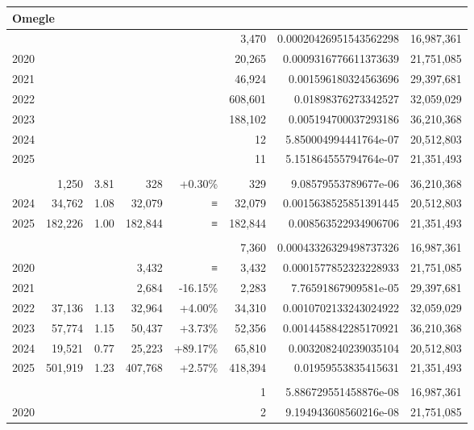 \begin{table}[!t]
\begin{tabular*}{\linewidth}{@{\extracolsep{\fill}}l|rrrrrrr}
\multicolumn{8}{l}{Omegle} \\[2.5pt] 
\midrule\addlinespace[2.5pt]
2019 &  &  &  &  & 3,470 & 0.00020426951543562298 & 16,987,361 \\
2020 &  &  &  &  & 20,265 & 0.0009316776611373639 & 21,751,085 \\
2021 &  &  &  &  & 46,924 & 0.001596180324563696 & 29,397,681 \\
2022 &  &  &  &  & 608,601 & 0.01898376273342527 & 32,059,029 \\
2023 &  &  &  &  & 188,102 & 0.005194700037293186 & 36,210,368 \\
2024 &  &  &  &  & 12 & 5.850004994441764e-07 & 20,512,803 \\
2025 &  &  &  &  & 11 & 5.151864555794764e-07 & 21,351,493 \\
\midrule\addlinespace[2.5pt]
\multicolumn{8}{l}{OpenAI} \\[2.5pt] 
\midrule\addlinespace[2.5pt]
2023 & 1,250 & 3.81 & 328 & +0.30\% & 329 & 9.08579553789677e-06 & 36,210,368 \\
2024 & 34,762 & 1.08 & 32,079 & ≡ & 32,079 & 0.0015638525851391445 & 20,512,803 \\
2025 & 182,226 & 1.00 & 182,844 & ≡ & 182,844 & 0.008563522934906706 & 21,351,493 \\
\midrule\addlinespace[2.5pt]
\multicolumn{8}{l}{Pinterest} \\[2.5pt] 
\midrule\addlinespace[2.5pt]
2019 &  &  &  &  & 7,360 & 0.00043326329498737326 & 16,987,361 \\
2020 &  &  & 3,432 & ≡ & 3,432 & 0.0001577852323228933 & 21,751,085 \\
2021 &  &  & 2,684 & -16.15\% & 2,283 & 7.76591867909581e-05 & 29,397,681 \\
2022 & 37,136 & 1.13 & 32,964 & +4.00\% & 34,310 & 0.0010702133243024922 & 32,059,029 \\
2023 & 57,774 & 1.15 & 50,437 & +3.73\% & 52,356 & 0.0014458842285170921 & 36,210,368 \\
2024 & 19,521 & 0.77 & 25,223 & +89.17\% & 65,810 & 0.003208240239035104 & 20,512,803 \\
2025 & 501,919 & 1.23 & 407,768 & +2.57\% & 418,394 & 0.01959553835415631 & 21,351,493 \\
\midrule\addlinespace[2.5pt]
\multicolumn{8}{l}{Quora} \\[2.5pt] 
\midrule\addlinespace[2.5pt]
2019 &  &  &  &  & 1 & 5.886729551458876e-08 & 16,987,361 \\
2020 &  &  &  &  & 2 & 9.194943608560216e-08 & 21,751,085 \\

\end{tabular*}
\end{table}
